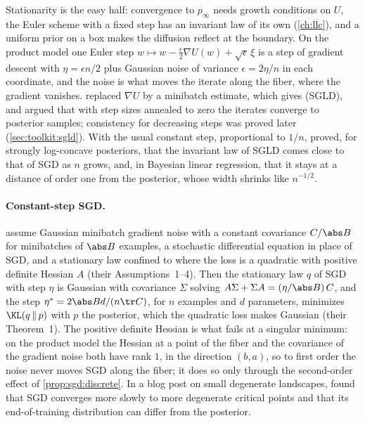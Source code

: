 \begin{refsection}
Stationarity is the easy half: convergence to $p_\infty$ needs growth conditions on $U$, the Euler scheme with a fixed step has an invariant law of its own (\cref{ch:llc}), and a uniform prior on a box makes the diffusion reflect at the boundary. On the product model one Euler step $w\mapsto w-\frac\epsilon2\nabla U(w)+\sqrt\epsilon\,\xi$ is a step of gradient descent with $\eta=\epsilon n/2$ plus Gaussian noise of variance $\epsilon=2\eta/n$ in each coordinate, and the noise is what moves the iterate along the fiber, where the gradient vanishes. \textcite{WellingTeh2011} replaced $\nabla U$ by a minibatch estimate, which gives  (SGLD), and argued that with step sizes annealed to zero the iterates converge to posterior samples; consistency for decreasing steps was proved later (\cref{sec:toolkit:sgld}). With the usual constant step, proportional to $1/n$, \textcite{BrosseEtAl2018} proved, for strongly log-concave posteriors, that the invariant law of SGLD comes close to that of SGD as $n$ grows, and, in Bayesian linear regression, that it stays at a distance of order one from the posterior, whose width shrinks like $n^{-1/2}$.

\paragraph{Constant-step SGD.} \Textcite{MandtEtAl2017} assume Gaussian minibatch gradient noise with a constant covariance $C/\abs B$ for minibatches of $\abs B$ examples, a stochastic differential equation in place of SGD, and a stationary law confined to where the loss is a quadratic with positive definite Hessian $A$ (their Assumptions~1--4). Then the stationary law $q$ of SGD with step $\eta$ is Gaussian with covariance $\Sigma$ solving $A\Sigma+\Sigma A=(\eta/\abs B)\,C$, and the step $\eta^*=2\abs Bd/(n\tr C)$, for $n$ examples and $d$ parameters, minimizes $\KL(q\,\|\,p)$ with $p$ the posterior, which the quadratic loss makes Gaussian (their Theorem~1). The positive definite Hessian is what fails at a singular minimum: on the product model the Hessian at a point of the fiber and the covariance of the gradient noise both have rank $1$, in the direction $(b,a)$, so to first order the noise never moves SGD along the fiber; it does so only through the second-order effect of \cref{prop:sgd:discrete}. In a blog post on small degenerate landscapes, \textcite{CorlouerMace2024} found that SGD converges more slowly to more degenerate critical points and that its end-of-training distribution can differ from the posterior.


\end{refsection}
